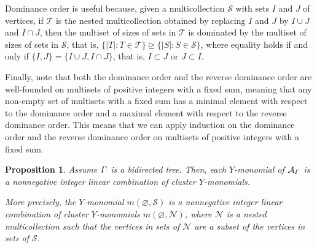 \documentclass[11pt]{article}
\newtheorem{prop}[theo]{Proposition}
\theoremstyle{definition}
\numberwithin{equation}{section}
\newcommand{\graphLPalgebra}[1]{\mathcal{A}_{#1}}
\newcommand{\monomial}[2]{m(#1, #2)}
\begin{document}
Dominance order is useful because,
given a multicollection \(\mathcal{S}\)
with sets \(I\) and \(J\) of vertices,
if \(\mathcal{T}\) is the nested multicollection obtained by replacing \(I\) and \(J\) by \(I \cup J\) and \(I \cap J\),
then the multiset of sizes of sets in \(\mathcal{T}\) is dominated by the multiset of sizes of sets in \(\mathcal{S}\), that is,
\( \{|T| : T \in \mathcal{T}\} \trianglerighteq \{|S| : S \in \mathcal{S}\} \),
where equality holds if and only if \(\{I, J\} = \{I \cup J, I \cap J\}\),
that is, \(I \subset J\) or \(J \subset I\).

Finally, note that both the dominance order and the reverse dominance order are well-founded on multisets of positive integers with a fixed sum, meaning that any non-empty set of multisets with a fixed sum has a minimal element with respect to the dominance order and a maximal element with respect to the reverse dominance order.
This means that we can apply induction on the dominance order and the reverse dominance order on multisets of positive integers with a fixed sum.

\begin{prop} \label{proposition:tree}
    Assume \(\varGamma\) is a bidirected tree.
    Then, each \(Y\)-monomial of \(\graphLPalgebra{\graph}\) is a nonnegative integer linear combination of cluster \(Y\)-monomials.

    More precisely, the \(Y\)-monomial \(\monomial{\varnothing}{\mathcal{S}}\) is a nonnegative integer linear combination of cluster \(Y\)-monomials \(\monomial{\varnothing}{\mathcal{N}}\), where \(\mathcal{N}\) is a nested multicollection such that the vertices in sets of \(\mathcal{N}\) are a subset of the vertices in sets of \(\mathcal{S}\).
\end{prop}
\end{document}
